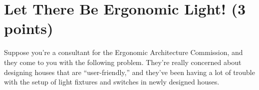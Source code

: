 \documentclass[letter,11pt]{article}
\begin{document}
\newpage

\section{Let There Be Ergonomic Light! (3 points)}
Suppose you’re a consultant for the Ergonomic Architecture Commission,
and they come to you with the following problem. They’re really concerned about designing houses that are “user-friendly,” and they’ve been having a lot of trouble with the setup of light fixtures and switches in newly designed houses.
\end{document}
